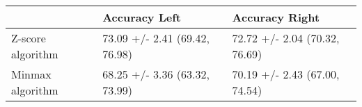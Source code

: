 \begin{tabular}{lll}
\toprule
{} &                  Accuracy Left &                 Accuracy Right \\
\midrule
Z-score algorithm &  73.09 +/- 2.41 (69.42, 76.98) &  72.72 +/- 2.04 (70.32, 76.69) \\
Minmax algorithm  &  68.25 +/- 3.36 (63.32, 73.99) &  70.19 +/- 2.43 (67.00, 74.54) \\
\bottomrule
\end{tabular}
